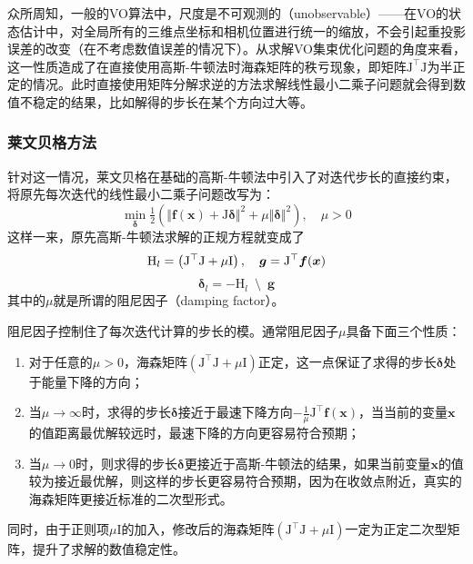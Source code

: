 众所周知，一般的VO算法中，尺度是不可观测的（unobservable）——在VO的状态估计中，对全局所有的三维点坐标和相机位置进行统一的缩放，不会引起重投影误差的改变（在不考虑数值误差的情况下）。从求解VO集束优化问题的角度来看，这一性质造成了在直接使用高斯-牛顿法时海森矩阵的秩亏现象，即矩阵$\mathrm{J}^\top\mathrm{J}$为半正定的情况。此时直接使用矩阵分解求逆的方法求解线性最小二乘子问题就会得到数值不稳定的结果，比如解得的步长在某个方向过大等。

\subsubsection*{莱文贝格方法}

针对这一情况，莱文贝格在基础的高斯-牛顿法中引入了对迭代步长的直接约束，将原先每次迭代的线性最小二乘子问题改写为：
\begin{equation}
    \mathop{\min}_{\bm{\delta}} \tfrac{1}{2}
    \left(
        \Vert \bm{f}(\bm{x}) + \mathrm{J}\bm{\delta} \Vert^2 +
        \mu \Vert \bm{\delta} \Vert^2
    \right), \quad \mu > 0
\end{equation}
这样一来，原先高斯-牛顿法求解的正规方程就变成了
\begin{equation}
    \mathrm{H}_{l} = \left( \mathrm{J}^\top\mathrm{J}+\mu\mathrm{I} \right), \quad
    \bm{g}         = \mathrm{J}^\top\bm{f}(\bm{x}) \\
\end{equation}
\begin{equation}
    \bm{\delta}_{l} = -\mathrm{H}_{l} \enspace\setminus\enspace \bm{g}
    \label{eq:levenberg}
\end{equation}
其中的$\mu$就是所谓的阻尼因子（damping factor）。

阻尼因子控制住了每次迭代计算的步长的模。通常阻尼因子$\mu$具备下面三个性质\citep{tingleff2004methods}：
\begin{enumerate}
    \item 对于任意的$\mu>0$，海森矩阵$(\mathrm{J}^\top\mathrm{J}+\mu\mathrm{I})$正定，这一点保证了求得的步长$\bm{\delta}$处于能量下降的方向；
    \item 当$\mu\to\infty$时，求得的步长$\bm{\delta}$接近于最速下降方向$-\frac{1}{\mu}\mathrm{J}^\top\bm{f}(\bm{x})$，当当前的变量$\bm{x}$ 的值距离最优解较远时，最速下降的方向更容易符合预期；
    \item 当$\mu\to0$时，则求得的步长$\bm{\delta}$更接近于高斯-牛顿法的结果，如果当前变量$\bm{x}$的值较为接近最优解，则这样的步长更容易符合预期，因为在收敛点附近，真实的海森矩阵更接近标准的二次型形式。
\end{enumerate}
同时，由于正则项$\mu\mathrm{I}$的加入，修改后的海森矩阵$(\mathrm{J}^\top\mathrm{J}+\mu\mathrm{I})$一定为正定二次型矩阵，提升了求解的数值稳定性。

